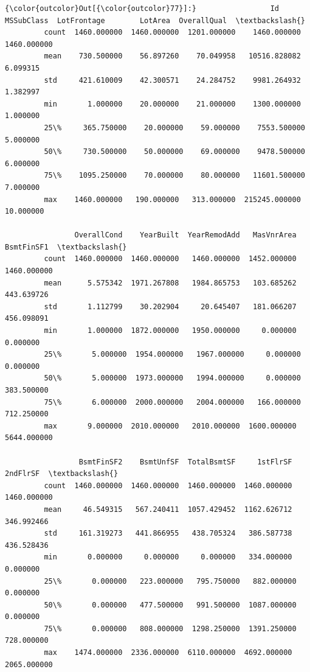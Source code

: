 \documentclass[11pt, a4paper , landscape]{article}
\begin{document}
\begin{Verbatim}[commandchars=\\\{\}]
{\color{outcolor}Out[{\color{outcolor}77}]:}                 Id   MSSubClass  LotFrontage        LotArea  OverallQual  \textbackslash{}
         count  1460.000000  1460.000000  1201.000000    1460.000000  1460.000000   
         mean    730.500000    56.897260    70.049958   10516.828082     6.099315   
         std     421.610009    42.300571    24.284752    9981.264932     1.382997   
         min       1.000000    20.000000    21.000000    1300.000000     1.000000   
         25\%     365.750000    20.000000    59.000000    7553.500000     5.000000   
         50\%     730.500000    50.000000    69.000000    9478.500000     6.000000   
         75\%    1095.250000    70.000000    80.000000   11601.500000     7.000000   
         max    1460.000000   190.000000   313.000000  215245.000000    10.000000   
         
                OverallCond    YearBuilt  YearRemodAdd   MasVnrArea   BsmtFinSF1  \textbackslash{}
         count  1460.000000  1460.000000   1460.000000  1452.000000  1460.000000   
         mean      5.575342  1971.267808   1984.865753   103.685262   443.639726   
         std       1.112799    30.202904     20.645407   181.066207   456.098091   
         min       1.000000  1872.000000   1950.000000     0.000000     0.000000   
         25\%       5.000000  1954.000000   1967.000000     0.000000     0.000000   
         50\%       5.000000  1973.000000   1994.000000     0.000000   383.500000   
         75\%       6.000000  2000.000000   2004.000000   166.000000   712.250000   
         max       9.000000  2010.000000   2010.000000  1600.000000  5644.000000   
         
                 BsmtFinSF2    BsmtUnfSF  TotalBsmtSF     1stFlrSF     2ndFlrSF  \textbackslash{}
         count  1460.000000  1460.000000  1460.000000  1460.000000  1460.000000   
         mean     46.549315   567.240411  1057.429452  1162.626712   346.992466   
         std     161.319273   441.866955   438.705324   386.587738   436.528436   
         min       0.000000     0.000000     0.000000   334.000000     0.000000   
         25\%       0.000000   223.000000   795.750000   882.000000     0.000000   
         50\%       0.000000   477.500000   991.500000  1087.000000     0.000000   
         75\%       0.000000   808.000000  1298.250000  1391.250000   728.000000   
         max    1474.000000  2336.000000  6110.000000  4692.000000  2065.000000   
         

\end{Verbatim}
\end{document}
